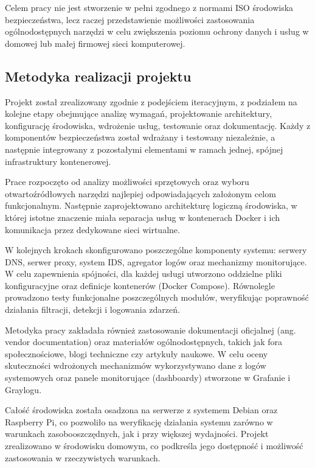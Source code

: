 \documentclass[
    left=2.5cm,         %
    right=2.5cm,        %
    top=2.5cm,          %
    bottom=3cm,         %
    bindingoffset=6mm,  %
    nohyphenation=true %
]{eiti/eiti-thesis} %
\begin{document}
Celem pracy nie jest stworzenie w pełni zgodnego z normami ISO środowiska bezpieczeństwa, lecz raczej przedstawienie możliwości zastosowania ogólnodostępnych narzędzi w celu zwiększenia poziomu ochrony danych i usług w domowej lub małej firmowej sieci komputerowej.

\subsection{Metodyka realizacji projektu}

Projekt został zrealizowany zgodnie z podejściem iteracyjnym, z podziałem na kolejne etapy obejmujące analizę wymagań, projektowanie architektury, konfigurację środowiska, wdrożenie usług, testowanie oraz dokumentację. Każdy z komponentów bezpieczeństwa został wdrażany i testowany niezależnie, a następnie integrowany z pozostałymi elementami w ramach jednej, spójnej infrastruktury kontenerowej.

Prace rozpoczęto od analizy możliwości sprzętowych oraz wyboru otwartoźródłowych narzędzi najlepiej odpowiadających założonym celom funkcjonalnym. Następnie zaprojektowano architekturę logiczną środowiska, w której istotne znaczenie miała separacja usług w kontenerach Docker i ich komunikacja przez dedykowane sieci wirtualne.

W kolejnych krokach skonfigurowano poszczególne komponenty systemu: serwery DNS, serwer proxy, system IDS, agregator logów oraz mechanizmy monitorujące. W celu zapewnienia spójności, dla każdej usługi utworzono oddzielne pliki konfiguracyjne oraz definicje kontenerów (Docker Compose). Równolegle prowadzono testy funkcjonalne poszczególnych modułów, weryfikując poprawność działania filtracji, detekcji i logowania zdarzeń.

Metodyka pracy zakładała również zastosowanie dokumentacji oficjalnej (ang. vendor documentation) oraz materiałów ogólnodostępnych, takich jak fora społecznościowe, blogi techniczne czy artykuły naukowe. W celu oceny skuteczności wdrożonych mechanizmów wykorzystywano dane z logów systemowych oraz panele monitorujące (dashboardy) stworzone w Grafanie i Graylogu.

Całość środowiska została osadzona na serwerze z systemem Debian oraz Raspberry Pi, co pozwoliło na weryfikację działania systemu zarówno w warunkach zasobooszczędnych, jak i przy większej wydajności. Projekt zrealizowano w środowisku domowym, co podkreśla jego dostępność i możliwość zastosowania w rzeczywistych warunkach.

\newpage 
\end{document}
